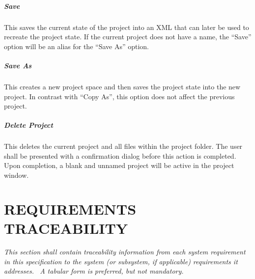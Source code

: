 \documentclass[twoside,letterpaper]{article}
\begin{document}
\subparagraph{Save}
{
This saves the current state of the project into an XML that can later be used to recreate the project state. If the current project does not have a name, the ``Save'' option will be an alias for the ``Save As'' option.}

\subparagraph{Save As}
{
This creates a new project space and then saves the project state into the new project. In contrast with ``Copy As'', this option does not affect the previous project. }

\subparagraph{Delete Project}
{
This deletes the current project and all files within the project folder. The user shall be presented with a confirmation dialog before this action is completed. Upon completion, a blank and unnamed project will be active in the project window. }









\clearpage\setcounter{page}{1}\pagestyle{Convertvi}
\section[REQUIREMENTS TRACEABILITY]{\rmfamily\bfseries
REQUIREMENTS TRACEABILITY}
{\itshape
This section shall contain traceability information from each system
requirement in this specification to the system (or subsystem, if
applicable) requirements it addresses. \ A tabular form is preferred,
but not mandatory.}


\bigskip
\end{document}

